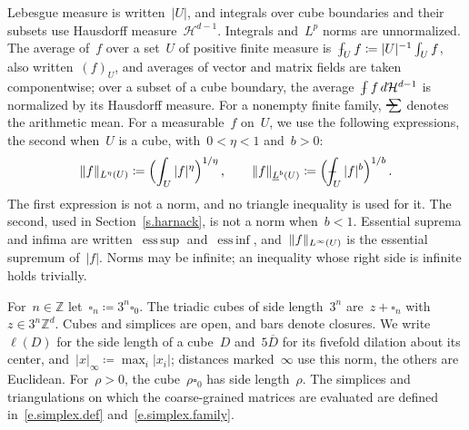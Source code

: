 \documentclass[11pt,letterpaper]{article}
\makeatletter
\numberwithin{equation}{section}
\theoremstyle{definition}
\newcommand{\Z}{\mathbb{Z}}
\newcommand{\Zd}{\mathbb{Z}^d}
\newcommand{\cu}{\square}
\DeclareMathOperator*{\esssup}{ess\,sup}
\DeclareMathOperator*{\essinf}{ess\,inf}
\DeclarePairedDelimiter{\norm}{\lVert}{\rVert}
\def\Xint#1{\mathchoice
	{\XXint\displaystyle\textstyle{#1}}%
	{\XXint\textstyle\scriptstyle{#1}}%
	{\XXint\scriptstyle\scriptscriptstyle{#1}}%
	{\XXint\scriptscriptstyle\scriptscriptstyle{#1}}%
	\!\int}
\def\XXint#1#2#3{{\setbox0=\hbox{$#1{#2#3}{\int}$}
		\vcenter{\hbox{$#2#3$}}\kern-.5\wd0}}
\def\fint{\Xint-}
\newcommand{\avsum}{\mathop{\mathpalette\avsuminner\relax}\displaylimits}
\newcommand\avsuminner[2]{%
	{\sbox0{$\m@th#1\sum$}%
		\vphantom{\usebox0}%
		\ooalign{%
			\hidewidth
			\smash{\,\rule[.23em]{8.8pt}{1.1pt} \relax}%
			\hidewidth\cr
			$\m@th#1\sum$\cr
		}%
	}%
}
\makeatother
\begin{document}
Lebesgue measure is written~$|U|$, and integrals over cube boundaries and their subsets use Hausdorff measure~$\mathcal H^{d-1}$. Integrals and~$L^p$ norms are unnormalized. The average of~$f$ over a set~$U$ of positive finite measure is~$\fint_Uf\coloneqq|U|^{-1}\int_Uf$, also written~$(f)_U$, and averages of vector and matrix fields are taken componentwise; over a subset of a cube boundary, the average~$\fint f\,d\mathcal H^{d-1}$ is normalized by its Hausdorff measure. For a nonempty finite family,~$\avsum$ denotes the arithmetic mean. For a measurable~$f$ on~$U$, we use the following expressions, the second when~$U$ is a cube, with~$0<\eta<1$ and~$b>0$:
\begin{equation*}
	\norm{f}_{L^\eta(U)}\coloneqq\Bigl(\int_U|f|^\eta\Bigr)^{1/\eta}\,,\qquad
	\norm{f}_{\underline L^b(U)}\coloneqq\Bigl(\fint_U|f|^b\Bigr)^{1/b}\,.
\end{equation*}
The first expression is not a norm, and no triangle inequality is used for it. The second, used in Section~\ref{s.harnack}, is not a norm when~$b<1$. Essential suprema and infima are written~$\esssup$ and~$\essinf$, and~$\norm{f}_{L^\infty(U)}$ is the essential supremum of~$|f|$. Norms may be infinite; an inequality whose right side is infinite holds trivially.

\smallskip

For~$n\in\Z$ let~$\cu_n\coloneqq3^n\cu_0$. The triadic cubes of side length~$3^n$ are~$z+\cu_n$ with~$z\in3^n\Zd$. Cubes and simplices are open, and bars denote closures. We write~$\ell(D)$ for the side length of a cube~$D$ and~$5\overline D$ for its fivefold dilation about its center, and~$|x|_\infty\coloneqq\max_i|x_i|$; distances marked~$\infty$ use this norm, the others are Euclidean. For~$\rho>0$, the cube~$\rho\cu_0$ has side length~$\rho$. The simplices and triangulations on which the coarse-grained matrices are evaluated are defined in~\eqref{e.simplex.def} and~\eqref{e.simplex.family}.

\smallskip
\end{document}
